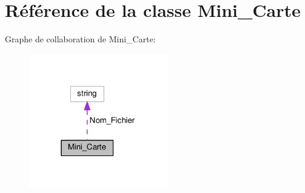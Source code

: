 \hypertarget{classMini__Carte}{\section{Référence de la classe Mini\+\_\+\+Carte}
\label{classMini__Carte}
}


Graphe de collaboration de Mini\+\_\+\+Carte\+:\nopagebreak
\begin{figure}[H]
\begin{center}
\leavevmode
\includegraphics[width=171pt]{classMini__Carte__coll__graph}
\end{center}
\end{figure}
